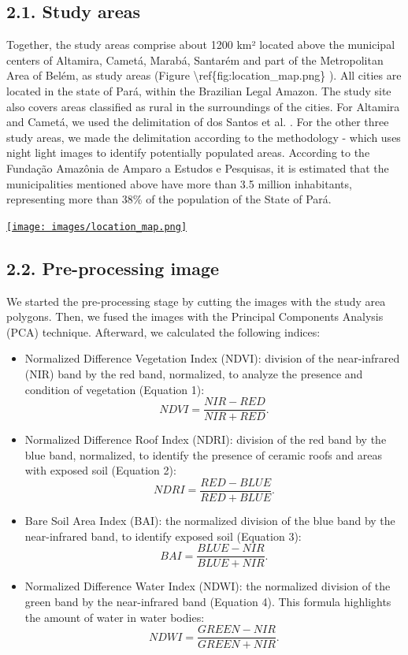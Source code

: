 \documentclass[preprint, 3p,
authoryear]{elsarticle} %
\providecommand{\tightlist}{%
  \setlength{\itemsep}{0pt}\setlength{\parskip}{0pt}}
\begin{document}
\hypertarget{study-areas}{%
\subsection{2.1. Study areas}\label{study-areas}}

Together, the study areas comprise about 1200 km² located above the
municipal centers of Altamira, Cametá, Marabá, Santarém and part of the
Metropolitan Area of Belém, as study areas (Figure
\textbackslash ref\{fig:location\_map.png\} ). All cities are located in
the state of Pará, within the Brazilian Legal Amazon. The study site
also covers areas classified as rural in the surroundings of the cities.
For Altamira and Cametá, we used the delimitation of dos Santos et al.
\citep{Santos2022}. For the other three study areas, we made the
delimitation according to the methodology \citep{Gonçalves2021} - which
uses night light images to identify potentially populated areas.
According to the Fundação Amazônia de Amparo a Estudos e Pesquisas, it
is estimated that the municipalities mentioned above have more than 3.5
million inhabitants, representing more than 38\% of the population of
the State of Pará.

\href{1}{\texttt{[image: images/location\_map.png]}}

\hypertarget{pre-processing-image}{%
\subsection{2.2. Pre-processing image}\label{pre-processing-image}}

We started the pre-processing stage by cutting the images with the study
area polygons. Then, we fused the images with the Principal Components
Analysis (PCA) technique. Afterward, we calculated the following
indices:

\begin{itemize}
\tightlist
\item
  Normalized Difference Vegetation Index (NDVI): division of the
  near-infrared (NIR) band by the red band, normalized, to analyze the
  presence and condition of vegetation (Equation 1): \[ 
  NDVI = \frac{NIR - RED}{NIR + RED}.
  \]
\item
  Normalized Difference Roof Index (NDRI): division of the red band by
  the blue band, normalized, to identify the presence of ceramic roofs
  and areas with exposed soil (Equation 2): \[ 
  NDRI = \frac{RED - BLUE}{RED + BLUE}.
  \]
\item
  Bare Soil Area Index (BAI): the normalized division of the blue band
  by the near-infrared band, to identify exposed soil (Equation 3): \[ 
  BAI = \frac{BLUE - NIR}{BLUE + NIR}.
  \]
\item
  Normalized Difference Water Index (NDWI): the normalized division of
  the green band by the near-infrared band (Equation 4). This formula
  highlights the amount of water in water bodies: \[ 
  NDWI = \frac{GREEN - NIR}{GREEN + NIR}.
  \]
\end{itemize}
\end{document}
